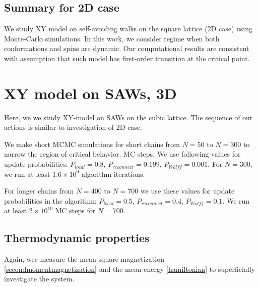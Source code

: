 \subsection{Summary for 2D case}
We study XY model on self-avoiding walks on the square lattice (2D case) using Monte-Carlo simulations. In this work, we consider regime when both conformations and spins are dynamic. Our computational results are consistent with assumption that such model has first-order transition at the critical point. 





\section{XY model on SAWs, 3D}
Here, we we study XY-model on SAWs on the cubic lattice. The sequence of our actions is similar to investigation of 2D case. 

We make short MCMC simulations for short chains from $N=50$ to $N=300$ to narrow the region of critical behavior. MC steps. We use following values for update probabilities: $P_{local}=0.8$, $P_{reconnect}=0.199$, $P_{Wolff}=0.001$. For $N=300$, we run at least $1.6 \times  10^{9} $ algorithm iterations.

For longer chains from $N=400$ to $N=700$ we use these values for update probabilities in the algorithm: $P_{local}=0.5$, $P_{reconnect}=0.4$, $P_{Wolff}=0.1$. We run at least $2\times 10^{10}$ MC steps for $N=700$. 

\subsection{Thermodynamic properties}

 Again, wee measure the mean square magnetization \eqref{secondmomentmagnetization} and the mean energy \eqref{hamiltonian} to superficially investigate the system. 
 
